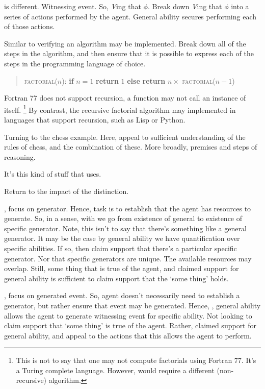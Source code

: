 \begin{note}
  \WR{} is different.
  Witnessing event.
  So, \emph{V}ing that \(\phi\).
  Break down \emph{V}ing that \(\phi\) into a series of actions performed by the agent.
  General ability secures performing each of those actions.

  Similar to verifying an algorithm may be implemented.
  Break down all of the steps in the algorithm, and then ensure that it is possible to express each of the steps in the programming language of choice.

  \begin{quote}
    \textsc{factorial}(\(n\)):\newline
    \textbf{if} \(n = 1\)\newline
    \mbox{}\indent \textbf{return} \(1\)\newline
    \textbf{else}\newline
    \mbox{}\indent \textbf{return} \(n \times\) \textsc{factorial}(\(n-1\))
  \end{quote}

  Fortran 77 does not support recursion, a function may not call an instance of itself.\nolinebreak
  \footnote{
    This is not to say that one may not compute factorials using Fortran 77.
    It's a Turing complete language.
    However, would require a different (non-recursive) algorithm.
  }
  By contrast, the recursive factorial algorithm may implemented in languages that support recursion, such as Lisp or Python.

  Turning to the chess example.
  Here, appeal to sufficient understanding of the rules of chess, and the combination of these.
  More broadly, premises and steps of reasoning.

  It's this kind of stuff that \WR{} uses.
\end{note}

\begin{note}
  Return to the impact of the distinction.

  \AR{}, focus on generator.
  Hence, task is to establish that the agent has resources to generate.
  So, in a sense, with \gsi{} we go from existence of general to existence of specific generator.
  Note, this isn't to say that there's something like a general generator.
  It may be the case by general ability we have quantification over specific abilities.
  If so, then claim support that there's a particular specific generator.
  Nor that specific generators are unique.
  The available resources may overlap.
  Still, some thing that is true of the agent, and claimed support for general ability is sufficient to claim support that the `some thing' holds.

  \WR{}, focus on generated event.
  So, agent doesn't necessarily need to establish a generator, but rather ensure that event may be generated.
  Hence, \gsi{}, general ability allows the agent to generate witnessing event for specific ability.
  Not looking to claim support that `some thing' is true of the agent.
  Rather, claimed support for general ability, and appeal to the actions that this allows the agent to perform.
\end{note}


